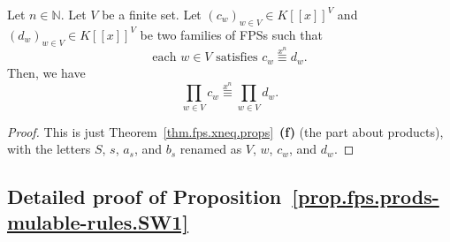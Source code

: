 \begin{lemma}
\label{lem.fps.prods-mulable-rules.SW1.lem1}
\leantarget
\leanok
Let $n \in \mathbb{N}$. Let $V$ be a finite set. Let
$\left(c_{w}\right)_{w \in V} \in K\left[\left[x\right]\right]^{V}$ and
$\left(d_{w}\right)_{w \in V} \in K\left[\left[x\right]\right]^{V}$ be
two families of FPSs such that
\[
\text{each } w \in V \text{ satisfies }
c_{w} \overset{x^n}{\equiv} d_{w}.
\]
Then, we have
\[
\prod_{w \in V} c_{w} \overset{x^n}{\equiv}
\prod_{w \in V} d_{w}.
\]
\end{lemma}

\begin{proof}
\leanok
This is just Theorem~\ref{thm.fps.xneq.props}~\textbf{(f)} (the
part about products), with the letters $S$, $s$, $a_s$, and $b_s$
renamed as $V$, $w$, $c_w$, and $d_w$.
\end{proof}

\subsection{Detailed proof of Proposition~\ref{prop.fps.prods-mulable-rules.SW1}}

